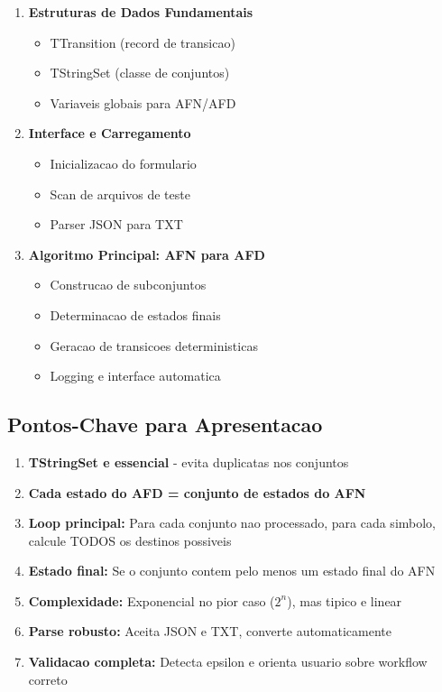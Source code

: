\documentclass[12pt,a4paper]{article}
\begin{document}
\begin{enumerate}
    \item \textbf{Estruturas de Dados Fundamentais}
    \begin{itemize}
        \item TTransition (record de transicao)
        \item TStringSet (classe de conjuntos)
        \item Variaveis globais para AFN/AFD
    \end{itemize}
    
    \item \textbf{Interface e Carregamento}
    \begin{itemize}
        \item Inicializacao do formulario
        \item Scan de arquivos de teste
        \item Parser JSON para TXT
    \end{itemize}
    
    \item \textbf{Algoritmo Principal: AFN para AFD}
    \begin{itemize}
        \item Construcao de subconjuntos
        \item Determinacao de estados finais
        \item Geracao de transicoes deterministicas
        \item Logging e interface automatica
    \end{itemize}
\end{enumerate}

\subsection{Pontos-Chave para Apresentacao}

\begin{enumerate}
    \item \textbf{TStringSet e essencial} - evita duplicatas nos conjuntos
    \item \textbf{Cada estado do AFD = conjunto de estados do AFN}
    \item \textbf{Loop principal:} Para cada conjunto nao processado, para cada simbolo, calcule TODOS os destinos possiveis
    \item \textbf{Estado final:} Se o conjunto contem pelo menos um estado final do AFN
    \item \textbf{Complexidade:} Exponencial no pior caso ($2^n$), mas tipico e linear
    \item \textbf{Parse robusto:} Aceita JSON e TXT, converte automaticamente
    \item \textbf{Validacao completa:} Detecta epsilon e orienta usuario sobre workflow correto
\end{enumerate}
\end{document}
